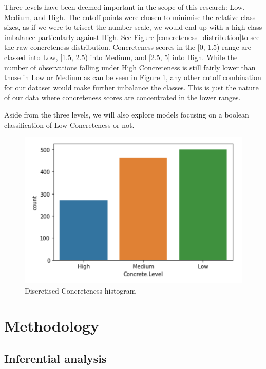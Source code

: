 \documentclass[12pt, a4paper]{article}
\begin{document}
Three levels have been deemed important in the scope of this research: Low, Medium, and High. The cutoff points were chosen to minimise the relative class sizes, as if we were to trisect the number scale, we would end up with a high class imbalance particularly against High. See Figure \ref{concreteness_distribution}to see the raw concreteness distribution. Concreteness scores in the [0, 1.5) range are classed into Low, [1.5, 2.5) into Medium, and [2.5, 5] into High. While the number of observations falling under High Concreteness is still fairly lower than those in Low or Medium as can be seen in Figure \ref{concreteness_discrete_distribution}, any other cutoff combination for our dataset would make further imbalance the classes. This is just the nature of our data where concreteness scores are concentrated in the lower ranges.

Aside from the three levels, we will also explore models focusing on a boolean classification of Low Concreteness or not. 

\begin{figure}
\centerline{\includegraphics[scale=0.8]{concreteness_discrete_distribution.png}}
\caption{Discretised Concreteness histogram}
\label{concreteness_discrete_distribution}
\end{figure}

\section{Methodology}

\subsection{Inferential analysis}
\end{document}
